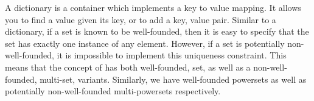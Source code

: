 \subChapterAppendix[title=Dictionaries, reference=dictionarySpec]

A dictionary is a container which implements a key to value mapping. It 
allows you to find a value given its key, or to add a key, value pair. 
Similar to a dictionary, if a set is known to be well-founded, then it is 
easy to specify that the set has exactly one instance of any element. 
However, if a set is potentially non-well-founded, it is impossible to 
implement this uniqueness constraint. This means that the concept of 
 has both well-founded, set, as well as a non-well-founded, 
multi-set, variants. Similarly, we have well-founded powersets as well as 
potentially non-well-founded multi-powersets respectively. 

\subChapterAppendix[title={Sets and Power Sets}, reference=setSpec]

\stopChapterAppendices
